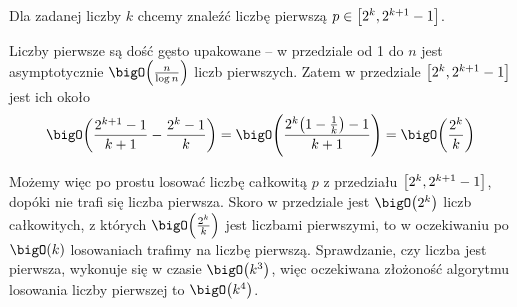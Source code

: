 Dla zadanej liczby \( k \) chcemy znaleźć liczbę pierwszą \( p \in \left[2^k, 2^{k+1}-1\right] \).

Liczby pierwsze są dość gęsto upakowane -- w przedziale od 1 do \( n \) jest asymptotycznie \( \bigO\pars{\frac{n}{\log n}} \) liczb pierwszych.
Zatem w przedziale \( \left[2^k, 2^{k+1}-1\right] \) jest ich około
\[
    \bigO\pars{\frac{2^{k+1} - 1}{k+1} - \frac{2^{k} - 1}{k}} = \bigO\pars{\frac{2^k\pars{1-\frac{1}{k}} - 1}{k+1}} = \bigO\pars{\frac{2^k}{k}}
\]

Możemy więc po prostu losować liczbę całkowitą \( p \) z przedziału \( \left[2^k, 2^{k+1}-1\right] \), dopóki nie trafi się liczba pierwsza.
Skoro w przedziale jest \( \bigO\pars{2^k} \) liczb całkowitych, z których \( \bigO\pars{\frac{2^k}{k}} \) jest liczbami pierwszymi, to w oczekiwaniu po \( \bigO(k) \) losowaniach trafimy na liczbę pierwszą.
Sprawdzanie, czy liczba jest pierwsza, wykonuje się w czasie \( \bigO\pars{k^3} \), więc oczekiwana złożoność algorytmu losowania liczby pierwszej to \( \bigO\pars{k^4} \).